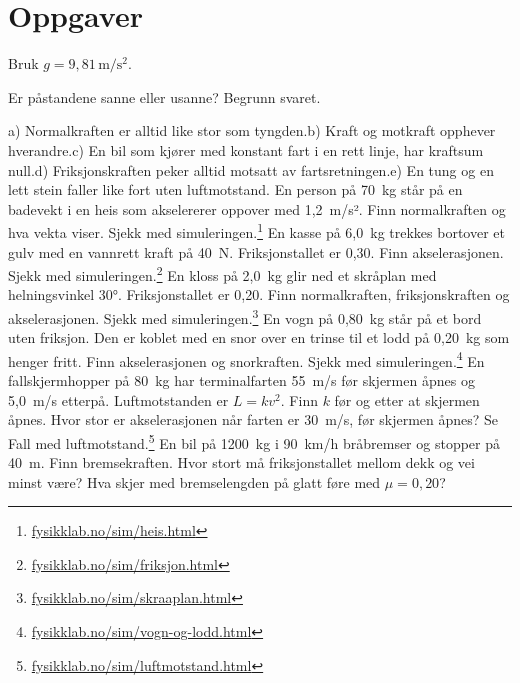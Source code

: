 \documentclass[11pt]{article}
\begin{document}
\section*{Oppgaver}

Bruk $g = 9{,}81\,\mathrm{m/s^{2}}$.

\begin{oppgaveliste}
\oppgave {}Er påstandene sanne eller usanne? Begrunn svaret.

a) Normalkraften er alltid like stor som tyngden.\newline b) Kraft og motkraft opphever hverandre.\newline c) En bil som kjører med konstant fart i en rett linje, har kraftsum null.\newline d) Friksjonskraften peker alltid motsatt av fartsretningen.\newline e) En tung og en lett stein faller like fort uten luftmotstand.
\svar
\oppgave {}En person på 70~kg står på en badevekt i en heis som akselererer oppover med 1,2~m/s². Finn normalkraften og hva vekta viser. Sjekk med simuleringen.\footnote{\url{fysikklab.no/sim/heis.html}}
\svar
\oppgave {}En kasse på 6,0~kg trekkes bortover et gulv med en vannrett kraft på 40~N. Friksjonstallet er 0,30. Finn akselerasjonen. Sjekk med simuleringen.\footnote{\url{fysikklab.no/sim/friksjon.html}}
\svar
\oppgave {}En kloss på 2,0~kg glir ned et skråplan med helningsvinkel 30°. Friksjonstallet er 0,20. Finn normalkraften, friksjonskraften og akselerasjonen. Sjekk med simuleringen.\footnote{\url{fysikklab.no/sim/skraaplan.html}}
\svar
\oppgave {}En vogn på 0,80~kg står på et bord uten friksjon. Den er koblet med en snor over en trinse til et lodd på 0,20~kg som henger fritt. Finn akselerasjonen og snorkraften. Sjekk med simuleringen.\footnote{\url{fysikklab.no/sim/vogn-og-lodd.html}}
\svar
\oppgave {}En fallskjermhopper på 80~kg har terminalfarten 55~m/s før skjermen åpnes og 5,0~m/s etterpå. Luftmotstanden er $L = kv^{2}$. Finn $k$ før og etter at skjermen åpnes. Hvor stor er akselerasjonen når farten er 30~m/s, før skjermen åpnes? Se Fall med luftmotstand.\footnote{\url{fysikklab.no/sim/luftmotstand.html}}
\svar
\oppgave {}En bil på 1200~kg i 90~km/h bråbremser og stopper på 40~m. Finn bremsekraften. Hvor stort må friksjonstallet mellom dekk og vei minst være? Hva skjer med bremselengden på glatt føre med $μ = 0{,}20$?
\svar
\end{oppgaveliste}
\end{document}
